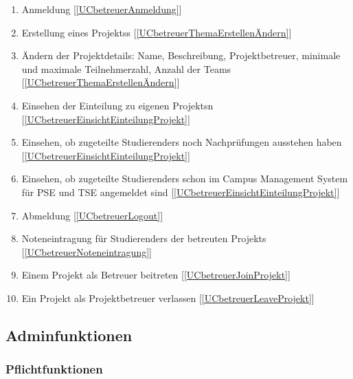 \documentclass[parskip=full]{scrartcl}
\newcommand{\swtLabel}[1]{\textbf{/#1\arabic*0/}}
\newcommand{\testRef}[1]{[\ref{#1}]}
\begin{document}
\begin{enumerate}[label=\swtLabel{FA}, resume]
  \item Anmeldung  \label{FAbetreuerAnmeldung} \testRef{UCbetreuerAnmeldung}
  \item Erstellung eines \glspl{Projekt}s \label{FAbetreuerAddProjekt}
  \testRef{UCbetreuerThemaErstellenÄndern}
  \item Ändern der \gls{Projektdetails}: Name, Beschreibung, \gls{Projektbetreuer},
        minimale und maximale Teilnehmerzahl, Anzahl der \glspl{Team}
        \label{FAbetreuerChangeProjekt} \testRef{UCbetreuerThemaErstellenÄndern}%
  \item Einsehen der \gls{Einteilung} zu eigenen \glspl{Projekt}n
  \label{FAbetreuerEinsichtEinteilung}
  \testRef{UCbetreuerEinsichtEinteilungProjekt}
  \item Einsehen, ob zugeteilte \glspl{Studierender} noch Nachprüfungen
  ausstehen haben \label{FAbetreuerEinsichtNachpruefung} \testRef{UCbetreuerEinsichtEinteilungProjekt}
  \item Einsehen, ob zugeteilte \glspl{Studierender} schon im Campus Management
  System für \gls{PSE} und \gls{TSE} angemeldet sind
  \label{FAbetreuerEinsichtTSE} \testRef{UCbetreuerEinsichtEinteilungProjekt}
  \item Abmeldung \label{FAbetreuerAbmeldung} \testRef{UCbetreuerLogout}
  \item Noteneintragung für \glspl{Studierender} der betreuten \glspl{Projekt}
  \label{FAbetreuerNoten} \testRef{UCbetreuerNoteneintragung}
  \item Einem \gls{Projekt} als Betreuer beitreten \label{FAbetreuerJoinProjekt}
  \testRef{UCbetreuerJoinProjekt}
  \item Ein \gls{Projekt} als \gls{Projektbetreuer} verlassen \label{FAbetreuerLeaveprojekt}
  \testRef{UCbetreuerLeaveProjekt}

\end{enumerate}

\subsection{\gls{Admin}funktionen}

\subsubsection{Pflichtfunktionen}
\end{document}
